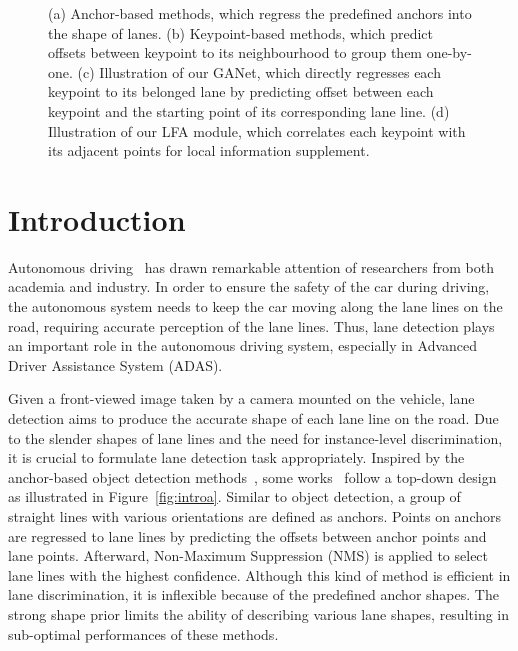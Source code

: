 \documentclass[10pt,twocolumn,letterpaper]{article}
\begin{document}
\begin{figure}[!t]
    \centering
    \quad
    \caption{(a) Anchor-based methods, which regress the predefined anchors into the shape of lanes. (b) Keypoint-based methods, which predict offsets between keypoint to its neighbourhood to group them one-by-one. (c) Illustration of our GANet, which directly regresses each keypoint to its belonged lane by predicting offset between each keypoint and the starting point of its corresponding lane line. (d) Illustration of our LFA module, which correlates each keypoint with its adjacent points for local information supplement.}
\end{figure}

\section{Introduction}
\label{sec:intro}
Autonomous driving~\cite{linecnn} has drawn remarkable attention of researchers from both academia and industry.
In order to ensure the safety of the car during driving, the autonomous system needs to keep the car moving along the lane lines on the road, requiring accurate perception of the lane lines.
Thus, lane detection plays an important role in the autonomous driving system, especially in Advanced Driver Assistance System (ADAS).

Given a front-viewed image taken by a camera mounted on the vehicle, lane detection aims to produce the accurate shape of each lane line on the road. 
Due to the slender shapes of lane lines and the need for instance-level discrimination, it is crucial to formulate lane detection task appropriately.
Inspired by the anchor-based object detection methods~\cite{ren2015faster}, some works~\cite{Tabelini_2021_CVPR,linecnn} follow a top-down design as illustrated in Figure~\ref{fig:introa}. 
Similar to object detection, a group of straight lines with various orientations are defined as anchors.
Points on anchors are regressed to lane lines by predicting the offsets between anchor points and lane points.
Afterward, Non-Maximum Suppression (NMS) is applied to select lane lines with the highest confidence.
Although this kind of method is efficient in lane discrimination, it is inflexible because of the predefined anchor shapes. 
The strong shape prior limits the ability of describing various lane shapes, resulting in sub-optimal performances of these methods.
\end{document}
